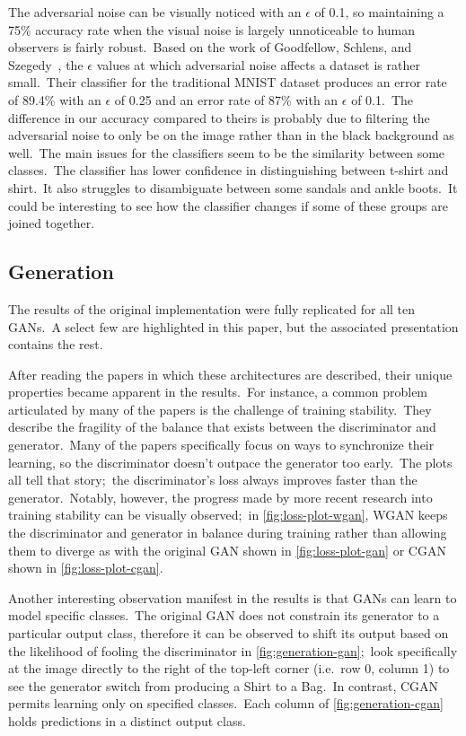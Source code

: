 \documentclass[conference]{IEEEtran}
\begin{document}
    The adversarial noise can be visually noticed with an \(\epsilon\) of 0.1, so maintaining a 75\% accuracy rate when the visual noise is largely unnoticeable to human observers is fairly robust.\ Based on the work of Goodfellow, Schlens, and Szegedy~\cite{adversarialexamples}, the \(\epsilon\) values at which adversarial noise affects a dataset is rather small.\ Their classifier for the traditional MNIST dataset produces an error rate of 89.4\% with an \(\epsilon\) of 0.25 and an error rate of 87\% with an \(\epsilon\) of 0.1.\ The difference in our accuracy compared to theirs is probably due to filtering the adversarial noise to only be on the image rather than in the black background as well.\ The main issues for the classifiers seem to be the similarity between some classes.\ The classifier has lower confidence in distinguishing between t-shirt and shirt.\ It also struggles to disambiguate between some sandals and ankle boots.\ It could be interesting to see how the classifier changes if some of these groups are joined together.

    \subsection{Generation}\label{subsec:results-generation}

    The results of the original implementation were fully replicated for all ten GANs.\ A select few are highlighted in this paper, but the associated presentation contains the rest.

    After reading the papers in which these architectures are described, their unique properties became apparent in the results.\ For instance, a common problem articulated by many of the papers is the challenge of training stability.\ They describe the fragility of the balance that exists between the discriminator and generator.\ Many of the papers specifically focus on ways to synchronize their learning, so the discriminator doesn't outpace the generator too early.\ The plots all tell that story;\ the discriminator's loss always improves faster than the generator.\ Notably, however, the progress made by more recent research into training stability can be visually observed;\ in \autoref{fig:loss-plot-wgan}, WGAN keeps the discriminator and generator in balance during training rather than allowing them to diverge as with the original GAN shown in \autoref{fig:loss-plot-gan} or CGAN shown in \autoref{fig:loss-plot-cgan}.

    Another interesting observation manifest in the results is that GANs can learn to model specific classes.\ The original GAN does not constrain its generator to a particular output class, therefore it can be observed to shift its output based on the likelihood of fooling the discriminator in \autoref{fig:generation-gan};\ look specifically at the image directly to the right of the top-left corner (i.e.\ row 0, column 1) to see the generator switch from producing a Shirt to a Bag.\ In contrast, CGAN permits learning only on specified classes.\ Each column of \autoref{fig:generation-cgan} holds predictions in a distinct output class.
\end{document}
